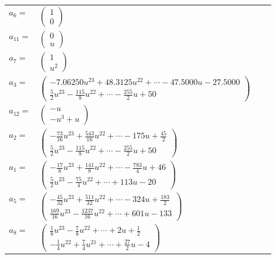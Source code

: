 \documentclass[1p]{elsarticle_modified}
\theoremstyle{definition}
\begin{document}
\begin{tabular}{m{7pt} m{180pt} m{7pt} m{180pt} }
\flushright $a_{6}=$&$\begin{pmatrix}1\\0\end{pmatrix}$ \\
\flushright $a_{11}=$&$\begin{pmatrix}0\\u\end{pmatrix}$ \\
\flushright $a_{7}=$&$\begin{pmatrix}1\\u^2\end{pmatrix}$ \\
\flushright $a_{3}=$&$\begin{pmatrix}-7.06250 u^{23}+48.3125 u^{22}+\cdots-47.5000 u-27.5000\\\frac{5}{2} u^{23}-\frac{115}{8} u^{22}+\cdots-\frac{255}{2} u+50\end{pmatrix}$ \\
\flushright $a_{12}=$&$\begin{pmatrix}- u\\- u^3+u\end{pmatrix}$ \\
\flushright $a_{2}=$&$\begin{pmatrix}-\frac{73}{16} u^{23}+\frac{543}{16} u^{22}+\cdots-175 u+\frac{45}{2}\\\frac{5}{2} u^{23}-\frac{115}{8} u^{22}+\cdots-\frac{255}{2} u+50\end{pmatrix}$ \\
\flushright $a_{1}=$&$\begin{pmatrix}-\frac{17}{8} u^{23}+\frac{141}{8} u^{22}+\cdots-\frac{783}{4} u+46\\\frac{5}{2} u^{23}-\frac{75}{4} u^{22}+\cdots+113 u-20\end{pmatrix}$ \\
\flushright $a_{5}=$&$\begin{pmatrix}-\frac{45}{32} u^{23}+\frac{511}{32} u^{22}+\cdots-324 u+\frac{183}{2}\\\frac{169}{16} u^{23}-\frac{1237}{16} u^{22}+\cdots+601 u-133\end{pmatrix}$ \\
\flushright $a_{8}=$&$\begin{pmatrix}\frac{1}{8} u^{23}-\frac{7}{8} u^{22}+\cdots+2 u+\frac{1}{2}\\-\frac{1}{4} u^{22}+\frac{7}{4} u^{21}+\cdots+\frac{27}{2} u-4\end{pmatrix}$ \\

\end{tabular}
\end{document}
